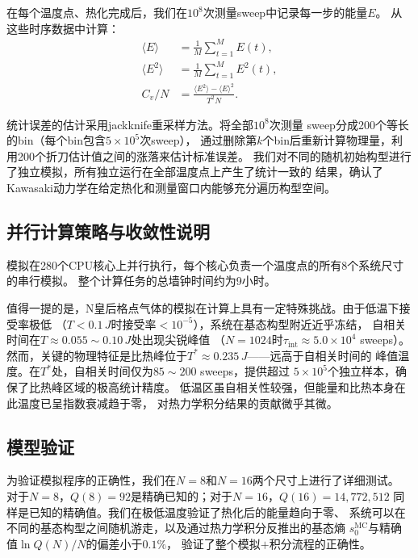 在每个温度点、热化完成后，我们在$10^{8}$次测量sweep中记录每一步的能量$E$。
从这些时序数据中计算：
%
\begin{align}
  \langle E\rangle &= \frac{1}{M}\sum_{t=1}^{M} E(t), \\
  \langle E^{2}\rangle &= \frac{1}{M}\sum_{t=1}^{M} E^{2}(t), \\
  C_{v}/N &= \frac{\langle E^{2}\rangle - \langle E\rangle^{2}}{T^{2}N}.
\end{align}

统计误差的估计采用jackknife重采样方法\cite{Efron1982}。将全部$10^{8}$次测量
sweep分成200个等长的bin（每个bin包含$5\times10^{5}$次sweep），
通过删除第$k$个bin后重新计算物理量，利用200个折刀估计值之间的涨落来估计标准误差。
我们对不同的随机初始构型进行了独立模拟，所有独立运行在全部温度点上产生了统计一致的
结果，确认了Kawasaki动力学在给定热化和测量窗口内能够充分遍历构型空间。

\subsection{并行计算策略与收敛性说明}

模拟在280个CPU核心上并行执行，每个核心负责一个温度点的所有8个系统尺寸的串行模拟。
整个计算任务的总墙钟时间约为9小时。

值得一提的是，N皇后格点气体的模拟在计算上具有一定特殊挑战。由于低温下接受率极低
（$T<0.1\,J$时接受率$<10^{-5}$），系统在基态构型附近近乎冻结，
自相关时间在$T\approx0.055\sim0.10\,J$处出现尖锐峰值
（$N=1024$时$\tau_{\text{int}}\approx5.0\times10^{4}$ sweeps）。
然而，关键的物理特征是比热峰位于$T^{*}\approx0.235\,J$——远高于自相关时间的
峰值温度。在$T^{*}$处，自相关时间仅为$85\sim200$ sweeps，提供超过
$5\times10^{5}$个独立样本，确保了比热峰区域的极高统计精度。
低温区虽自相关性较强，但能量和比热本身在此温度已呈指数衰减趋于零，
对热力学积分结果的贡献微乎其微。

\subsection{模型验证}

为验证模拟程序的正确性，我们在$N=8$和$N=16$两个尺寸上进行了详细测试。
对于$N=8$，$Q(8)=92$是精确已知的；对于$N=16$，$Q(16)=14{,}772{,}512$
同样是已知的精确值。我们在极低温度验证了热化后的能量趋向于零、
系统可以在不同的基态构型之间随机游走，以及通过热力学积分反推出的基态熵
$s_{0}^{\text{MC}}$与精确值$\ln Q(N)/N$的偏差小于$0.1\%$，
验证了整个模拟$+$积分流程的正确性。

